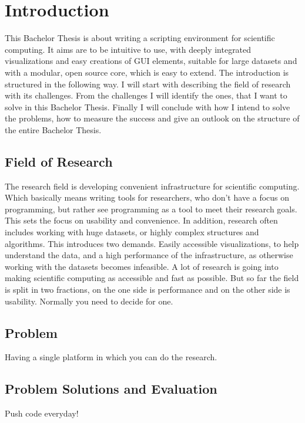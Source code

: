 \section{Introduction}


This Bachelor Thesis is about writing a scripting environment for scientific computing. 
It aims are to be intuitive to use, with deeply integrated visualizations and easy creations of \ac{GUI} elements, suitable for large datasets and with a modular, open source core, which is easy to extend.
The introduction is structured in the following way.
I will start with describing the field of research with its challenges. 
From the challenges I will identify the ones, that I want to solve in this Bachelor Thesis.
Finally I will conclude with how I intend to solve the problems, how to measure the success and give an outlook on the structure of the entire Bachelor Thesis.

\subsection{Field of Research}
The research field is developing convenient infrastructure for scientific computing.
Which basically means writing tools for researchers, who don't have a focus on programming, but rather see programming as a tool to meet their research goals. This sets the focus on usability and convenience.
In addition, research often includes working with huge datasets, or highly complex structures and algorithms.
This introduces two demands. Easily accessible visualizations, to help understand the data, and a high performance of the infrastructure, as otherwise working with the datasets becomes infeasible.
A lot of research is going into making scientific computing as accessible and fast as possible. But so far the field is split in two fractions, on the one side is performance and on the other side is usability. Normally you need to decide for one.


\subsection{Problem}
Having a single platform in which you can do the research.
\subsection{Problem Solutions and Evaluation}
Push code everyday!
